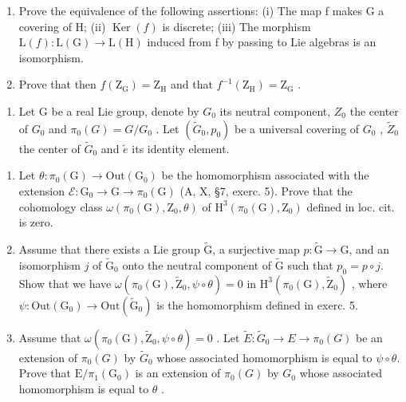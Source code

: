 \begin{enumerate}
\def\labelenumi{\alph{enumi})}
\item
  Prove the equivalence of the following assertions: (i) The map f makes G a covering of H; (ii) \(\operatorname{Ker}(f)\) is discrete; (iii) The morphism \(\mathrm{L}(f)\colon\mathrm{L}(\mathrm{G})\to\mathrm{L}(\mathrm{H})\) induced from f by passing to Lie algebras is an isomorphism.
\item
  Prove that then \(f(\mathrm{Z}_{\mathrm{G}})=\mathrm{Z}_{\mathrm{H}}\) and that \(f^{-1}(\mathrm{Z}_{\mathrm{H}})=\mathrm{Z}_{\mathrm{G}}\) .
\end{enumerate}

\begin{enumerate}
\def\labelenumi{\arabic{enumi})}
\setcounter{enumi}{6}
\tightlist
\item
  Let G be a real Lie group, denote by \(G_{0}\) its neutral component, \(Z_{0}\) the center of \(G_{0}\) and \(\pi_{0}(G)=G/G_{0}\) . Let \((\widetilde{G}_{0},p_{0})\) be a universal covering of \(G_{0}\) , \(\widetilde{Z}_{0}\) the center of \(\widetilde{G}_{0}\) and \(\widetilde{e}\) its identity element.
\end{enumerate}

\begin{enumerate}
\def\labelenumi{\alph{enumi})}
\item
  Let \(\theta\colon\pi_{0}(\mathrm{G})\to\mathrm{Out}(\mathrm{G}_{0})\) be the homomorphism associated with the extension \(\mathcal{E}\colon\mathrm{G}_{0}\to\mathrm{G}\to\pi_{0}(\mathrm{G})\) (A, X, §7, exerc. 5). Prove that the cohomology class \(\omega(\pi_{0}(\mathrm{G}),\mathrm{Z}_{0},\theta)\) of \(\mathrm{H}^{3}(\pi_{0}(\mathrm{G}),\mathrm{Z}_{0})\) defined in loc. cit. is zero.
\item
  Assume that there exists a Lie group \(\widetilde{\mathrm{G}}\), a surjective map \(p\colon\widetilde{\mathrm{G}}\to\mathrm{G}\), and an isomorphism \(j\) of \(\widetilde{\mathrm{G}}_{0}\) onto the neutral component of \(\widetilde{\mathrm{G}}\) such that \(p_{0}=p\circ j\). Show that we have \(\omega(\pi_{0}(\mathrm{G}),\widetilde{\mathrm{Z}}_{0},\psi\circ\theta)=0\) in \(\mathrm{H}^{3}(\pi_{0}(\mathrm{G}),\widetilde{\mathrm{Z}}_{0})\) , where \(\psi\colon\mathrm{Out}(\mathrm{G}_{0})\to\mathrm{Out}(\widetilde{\mathrm{G}}_{0})\) is the homomorphism defined in exerc. 5.
\item
  Assume that \(\omega(\pi_{0}(\mathrm{G}),\widetilde{\mathrm{Z}}_{0},\psi\circ\theta)=0\) . Let \(\widetilde{E}\colon\widetilde{G}_{0}\to E\to\pi_{0}(G)\) be an extension of \(\pi_{0}(G)\) by \(\widetilde{G}_{0}\) whose associated homomorphism is equal to \(\psi\circ\theta\). Prove that \(\mathrm{E}/\pi_{1}(\mathrm{G}_{0})\) is an extension of \(\pi_{0}(G)\) by \(G_{0}\) whose associated homomorphism is equal to \(\theta\) .
\end{enumerate}

